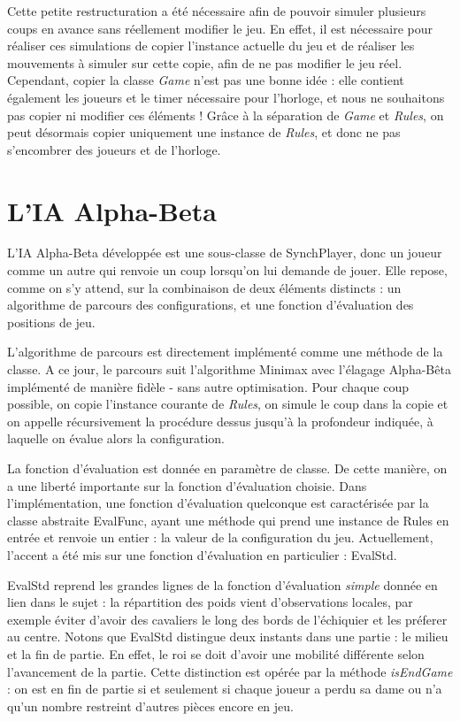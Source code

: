 \documentclass[11pt]{article}
\begin{document}
\-

Cette petite restructuration a été nécessaire afin de pouvoir simuler plusieurs coups en avance sans réellement modifier le jeu.
En effet, il est nécessaire pour réaliser ces simulations de copier l'instance actuelle du jeu et de réaliser les mouvements à simuler sur cette copie, afin de ne pas modifier le jeu réel. Cependant, copier la classe \textit{Game} n'est pas une bonne idée :
elle contient également les joueurs et le timer nécessaire pour l'horloge, et nous ne souhaitons pas copier ni modifier ces éléments !
Grâce à la séparation de \textit{Game} et \textit{Rules}, on peut désormais copier uniquement une instance de \textit{Rules}, et donc ne pas s'encombrer des joueurs et de l'horloge.

\section{L'IA Alpha-Beta}

L'IA Alpha-Beta développée est une sous-classe de SynchPlayer, donc un joueur comme un autre qui renvoie un coup lorsqu'on lui demande de jouer. Elle repose, comme on s'y attend, sur la combinaison de deux éléments distincts : un algorithme de parcours des configurations, et une fonction d'évaluation des positions de jeu.

\-

L'algorithme de parcours est directement implémenté comme une méthode de la classe. A ce jour, le parcours suit l'algorithme Minimax avec l'élagage Alpha-Bêta implémenté de manière fidèle - sans autre optimisation. Pour chaque coup possible, on copie l'instance courante de \textit{Rules}, on simule le coup dans la copie et on appelle récursivement la procédure dessus jusqu'à la profondeur indiquée, à laquelle on évalue alors la configuration.

\-

La fonction d'évaluation est donnée en paramètre de classe. De cette manière, on a une liberté importante sur la fonction d'évaluation choisie. Dans l'implémentation, une fonction d'évaluation quelconque est caractérisée par la classe abstraite EvalFunc, ayant une méthode qui prend une instance de Rules en entrée et renvoie un entier : la valeur de la configuration du jeu. Actuellement, l'accent a été mis sur une fonction d'évaluation en particulier : EvalStd.

\-

EvalStd reprend les grandes lignes de la fonction d'évaluation \textit{simple} donnée en lien dans le sujet : la répartition des poids vient d'observations locales, par exemple éviter d'avoir des cavaliers le long des bords de l'échiquier et les préferer au centre. Notons que EvalStd distingue deux instants dans une partie : le milieu et la fin de partie. En effet, le roi se doit d'avoir une mobilité différente selon l'avancement de la partie. Cette distinction est opérée par la méthode \textit{isEndGame} : on est en fin de partie si et seulement si chaque joueur a perdu sa dame ou n'a qu'un nombre restreint d'autres pièces encore en jeu.
\end{document}
